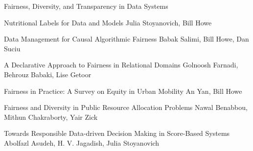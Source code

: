\documentclass[11pt]{article}
\begin{document}
\begin{bulletin}
\begin{articlesection}{Fairness, Diversity, and Transparency in Data Systems}
%
%
%


\begin{article}
{Nutritional Labels for Data and Models}
{Julia Stoyanovich, Bill Howe}
\graphicspath{{submissions/Stoyanovich/}}

\end{article}


\begin{article}
{Data Management for Causal Algorithmic Fairness}
{Babak Salimi, Bill Howe, Dan Suciu}
\graphicspath{{submissions/Salimi/salimi/}}

\end{article}


\begin{article}
{A Declarative Approach to Fairness in Relational Domains}
{Golnoosh Farnadi, Behrouz Babaki, Lise Getoor}
\graphicspath{{submissions/Getoor/}}

\end{article}


\begin{article}
{Fairness in Practice: A Survey on Equity in Urban Mobility}
{An Yan, Bill Howe}
\graphicspath{{submissions/Howe/}}

\end{article}


\begin{article}
{Fairness and Diversity in Public Resource Allocation Problems}
{Nawal Benabbou, Mithun Chakraborty, Yair Zick}
\graphicspath{{submissions/Zick/}}

\end{article}


\begin{article}
{Towards Responsible Data-driven Decision Making in Score-Based Systems}
{Abolfazl Asudeh, H. V. Jagadish, Julia Stoyanovich}
\graphicspath{{submissions/Jagadish/}}

\end{article}




\end{articlesection}
\end{bulletin}
\end{document}
